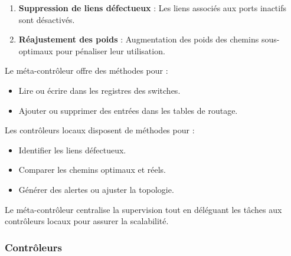 \documentclass[12pt,a4paper]{report}
\begin{document}
\begin{card}
            \begin{card}
            \begin{enumerate}
                \item \textbf{Suppression de liens d\'efectueux} : Les liens associ\'es aux ports inactifs sont d\'esactiv\'es.
                \item \textbf{R\'eajustement des poids} : Augmentation des poids des chemins sous-optimaux pour p\'enaliser leur utilisation.
            \end{enumerate}
            \end{card}
            \end{card}
            
            \begin{card}
            Le m\'eta-contr\^oleur offre des m\'ethodes pour :
            \begin{itemize}
                \item Lire ou \'ecrire dans les registres des switches.
                \item Ajouter ou supprimer des entr\'ees dans les tables de routage.
            \end{itemize}
            \end{card}
            
            \begin{card}
            Les contr\^oleurs locaux disposent de m\'ethodes pour :
            \begin{itemize}
                \item Identifier les liens d\'efectueux.
                \item Comparer les chemins optimaux et r\'eels.
                \item G\'en\'erer des alertes ou ajuster la topologie.
            \end{itemize}
            \end{card}
            
            \begin{card}
            Le m\'eta-contr\^oleur centralise la supervision tout en d\'el\'eguant les t\^aches aux contr\^oleurs locaux pour assurer la scalabilit\'e.
            \end{card}

        \subsubsection{Contrôleurs}
\end{document}
